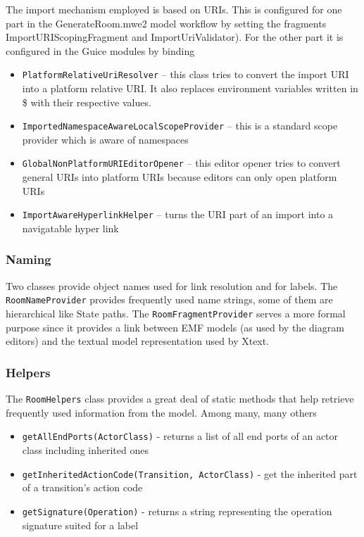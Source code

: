The import mechanism employed is based on URIs. This is configured for one part in the GenerateRoom.mwe2 
model workflow by setting the fragments ImportURIScopingFragment and ImportUriValidator). For the other 
part it is configured in the Guice modules by binding
\begin{itemize}
\item \texttt{PlatformRelativeUriResolver} -- this class tries to convert the import URI into a platform 
relative URI. It also replaces environment variables written in \${} with their respective values.
\item \texttt{ImportedNamespaceAwareLocalScopeProvider} -- this is a standard scope provider which is 
aware of namespaces
\item \texttt{GlobalNonPlatformURIEditorOpener} -- this editor opener tries to convert general URIs into 
platform URIs because editors can only open platform URIs
\item \texttt{ImportAwareHyperlinkHelper} -- turns the URI part of an import into a navigatable hyper link
\end{itemize}

\subsubsection{Naming}

Two classes provide object names used for link resolution and for labels.
The \texttt{RoomNameProvider} provides frequently used name strings, some of them are hierarchical like 
State paths.
The \texttt{RoomFragmentProvider} serves a more formal purpose since it provides a link between EMF models 
(as used by the diagram editors) and the textual model representation used by Xtext.

\subsubsection{Helpers}

The \texttt{RoomHelpers} class provides a great deal of static methods that help retrieve frequently used 
information from the model.
Among many, many others
\begin{itemize}
\item \texttt{getAllEndPorts(ActorClass)} - returns a list of all end ports of an actor class including 
inherited ones
\item \texttt{getInheritedActionCode(Transition, ActorClass)} - get the inherited part of a transition's 
action code
\item \texttt{getSignature(Operation)} - returns a string representing the operation signature suited for 
a label
\end{itemize}

